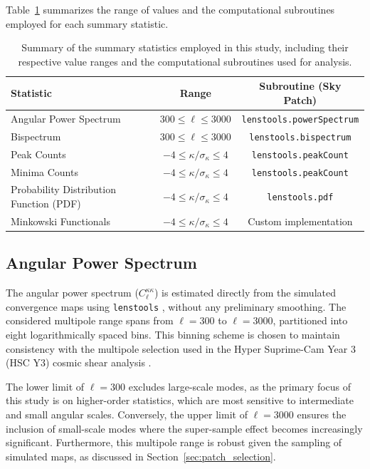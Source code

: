 Table~\ref{tab:statistics} summarizes the range of values and the computational subroutines employed for each summary statistic.
\begin{table}[htbp]
    \centering
    \begin{tabular}{lcc}
    \toprule
    \textbf{Statistic} & \textbf{Range} & \textbf{Subroutine (Sky Patch)} \\
    \midrule
    Angular Power Spectrum & $300 \leq \ell \leq 3000$ & \texttt{lenstools.powerSpectrum} \\
    Bispectrum & $300 \leq \ell \leq 3000$ & \texttt{lenstools.bispectrum} \\
    Peak Counts & $-4 \leq \kappa/\sigma_\kappa \leq 4$ & \texttt{lenstools.peakCount} \\
    Minima Counts & $-4 \leq \kappa/\sigma_\kappa \leq 4$ & \texttt{lenstools.peakCount} \\
    Probability Distribution Function (PDF) & $-4 \leq \kappa/\sigma_\kappa \leq 4$ & \texttt{lenstools.pdf} \\
    Minkowski Functionals & $-4 \leq \kappa/\sigma_\kappa \leq 4$ & Custom implementation \\
    \bottomrule
    \end{tabular}
    \caption{Summary of the summary statistics employed in this study, including their respective value ranges and the computational subroutines used for analysis.}
    \label{tab:statistics}
\end{table}

\subsection{Angular Power Spectrum}
The angular power spectrum ($C_{\ell}^{\kappa\kappa}$) is estimated directly from the simulated convergence maps using \texttt{lenstools} \citep{2016A&C....17...73P}, without any preliminary smoothing. The considered multipole range spans from $\ell = 300$ to $\ell = 3000$, partitioned into eight logarithmically spaced bins. This binning scheme is chosen to maintain consistency with the multipole selection used in the Hyper Suprime-Cam Year 3 (HSC Y3) cosmic shear analysis \citep{2023PhRvD.108l3519D}. 

The lower limit of $\ell = 300$ excludes large-scale modes, as the primary focus of this study is on higher-order statistics, which are most sensitive to intermediate and small angular scales. Conversely, the upper limit of $\ell = 3000$ ensures the inclusion of small-scale modes where the super-sample effect becomes increasingly significant. Furthermore, this multipole range is robust given the sampling of simulated maps, as discussed in Section~\ref{sec:patch_selection}.


